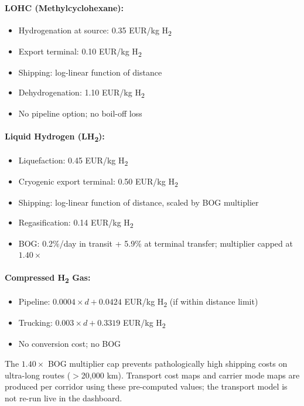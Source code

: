 \paragraph{LOHC (Methylcyclohexane):}
\begin{itemize}
    \item Hydrogenation at source: 0.35 EUR/kg H\textsubscript{2}
    \item Export terminal: 0.10 EUR/kg H\textsubscript{2}
    \item Shipping: log-linear function of distance
    \item Dehydrogenation: 1.10 EUR/kg H\textsubscript{2}
    \item No pipeline option; no boil-off loss
\end{itemize}

\paragraph{Liquid Hydrogen (LH\textsubscript{2}):}
\begin{itemize}
    \item Liquefaction: 0.45 EUR/kg H\textsubscript{2}
    \item Cryogenic export terminal: 0.50 EUR/kg H\textsubscript{2}
    \item Shipping: log-linear function of distance, scaled by BOG multiplier
    \item Regasification: 0.14 EUR/kg H\textsubscript{2}
    \item BOG: 0.2\%/day in transit + 5.9\% at terminal transfer; multiplier capped at $1.40\times$
\end{itemize}

\paragraph{Compressed H\textsubscript{2} Gas:}
\begin{itemize}
    \item Pipeline: $0.0004 \times d + 0.0424$ EUR/kg H\textsubscript{2} (if within distance limit)
    \item Trucking: $0.003 \times d + 0.3319$ EUR/kg H\textsubscript{2}
    \item No conversion cost; no BOG
\end{itemize}

The $1.40\times$ BOG multiplier cap prevents pathologically high shipping costs on ultra-long routes ($>$20{,}000 km). Transport cost maps and carrier mode maps are produced per corridor using these pre-computed values; the transport model is not re-run live in the dashboard.

